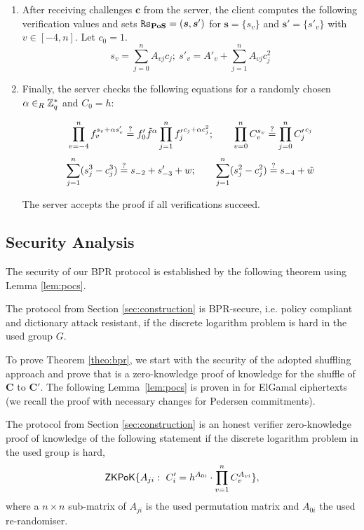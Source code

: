 \begin{enumerate}
\item After receiving challenges $\bm c$ from the server, the client computes the following verification values and sets \allowbreak $\mathtt{Rs}_\mathsf{\bf PoS}=(\bm s, \bm s')$ for $\bm s = \{s_v\}$ and $\bm s' = \{s'_v\}$ with $v\in[-4,n]$.
Let $c_0=1$.
\[ s_v = \sum_{j=0}^{n} A_{vj}c_j;~ s'_v = A'_v + \sum_{j=1}^{n} A_{vj}c_j^2 \] %


\item Finally, the server checks the following equations for a randomly chosen $\alpha\in_R\mathbb{Z}^\ast_q$ and $C_0=h$:

\[  \prod_{v=-4}^{n} f_v^{s_v+\alpha s'_v} \stackrel{?}{=} f'_0\tilde{f}^\alpha \prod_{j=1}^n {f'_j}^{c_j+\alpha c_j^2};\hspace*{2em}
    \prod_{v=0}^n C_v^{s_v} \stackrel{?}{=} \prod_{j=0}^n {C'_j}^{c_j} \]
\[  \sum_{j=1}^n (s_j^3 - c_j^3) \stackrel{?}{=} s_{-2} + s'_{-3} + w;\hspace*{2em}
    \sum_{j=1}^n (s_j^2 - c_j^2) \stackrel{?}{=} s_{-4} + \tilde{w} \]

\noindent
The server accepts the \PoS proof if all verifications succeed.

\end{enumerate}

\subsection{Security Analysis}
The security of our \ac{BPR} protocol is established by the following theorem using Lemma \ref{lem:pocs}.

\begin{theorem}\label{theo:bpr}
  The protocol from Section \ref{sec:construction} is \ac{BPR}-secure, i.e. policy compliant and dictionary attack resistant, if the discrete logarithm problem is hard in the used group $G$.
\end{theorem}

\noindent
To prove Theorem \ref{theo:bpr}, we start with the security of the adopted shuffling approach and prove that \PoS is a zero-knowledge proof of knowledge for the shuffle of $\bm C$ to $\bm C'$.
The following Lemma~\ref{lem:pocs} is proven in \cite{Furukawa05} for ElGamal ciphertexts (we recall the proof with necessary changes for Pedersen commitments).

\begin{lemma} \label{lem:pocs}
  The \PoS protocol from Section \ref{sec:construction} is an honest verifier zero-knowledge proof of knowledge of the following statement if the discrete logarithm problem in the used group is hard,
  \[\mathsf{ZKPoK}\{A_{ji}:~ C'_i=h^{A_{0i}}\cdot\prod_{v=1}^n C_v^{A_{vi}}\},\]
  where a $n\times n$ sub-matrix of $A_{ji}$ is the used permutation matrix and $A_{0i}$ the used re-randomiser.
\end{lemma}

